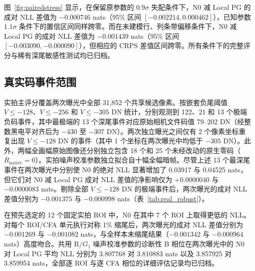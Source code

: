 \documentclass[10pt,twocolumn,journal]{IEEEtran}
\begin{document}
图~\ref{fig:pairedstress} 显示，在保留原参数的 $0.9\sigma$ 失配条件下，N0 减 Local PG 的成对 NLL 差值为 $-0.000746$ nats（95\% 区间 $[-0.002214,0.000462]$），已知参数 $1.1\sigma$ 条件下的置信区间同样跨零。而在未建模行、列条带偏移条件下，N0 减 Local PG 的成对 NLL 差值为 $-0.001439$ nats（95\% 区间 $[-0.003090,-0.000090]$），但相应的 CRPS 差值区间跨零。所有条件下的完整评分与稀有深尾敏感性测试均已归档。

\subsection{真实码事件范围}\label{sec:realcode}
实拍主评分覆盖两次曝光中全部 31,852 个共享候选像素。按嵌套负尾阈值 $V\leq-128$、$V\leq-256$ 和 $V\leq-305$ DN 统计，分别观测到 122、21 和 13 个极端负码事件，其中最极端的 13 个深尾事件对应原始相机文件码值 79--202 DN（经整数黑电平对齐后为 $-430$ 至 $-307$ DN）。两次独立曝光之间仅有 2 个像素坐标重复出现 $V\leq-128$ DN 的事件（其中 1 个坐标在两次曝光中均低于 $-305$ DN）。此外，两幅全画幅原始图像还分别独立包含 18 个和 25 个未经改动的原生零码（$R_{\mathrm{native}}=0$）。实拍噪声校准参数独立拟合自十幅全幅暗帧。尽管上述 13 个最深尾事件在两次曝光中分别使 N0 的绝对 NLL 显著增加了 0.03917 与 0.04525 nats，但它们对 N0 减 Local PG 成对 NLL 差值的净影响仅为 $+0.0000040$ 与 $-0.0000083$ nats。剔除全部 $V\leq-128$ DN 的极端事件后，两次曝光的成对 NLL 差值分别为 $-0.001375$ 与 $-0.000998$ nats（表~\ref{tab:real_robust}）。

在预先选定的 12 个固定实拍 ROI 中，N0 在其中 7 个 ROI 上取得更低的 NLL。对每个 ROI/CFA 单元执行对称 1\% 缩尾后，两次曝光的成对 NLL 差值分别为 $-0.001269$ 与 $-0.001082$ nats，与全样本未缩尾结果（$-0.001342$ 与 $-0.000964$ nats）高度吻合。共用 R/$G_1$ 噪声校准参数的诊断性 B 相位在两次曝光中的 N0 对 Local PG 平均 NLL 分别为 3.807768 对 3.810883 nats 以及 3.857925 对 3.859954 nats，全部逐 ROI 与逐 CFA 相位的详细评估记录均已归档。
\end{document}
